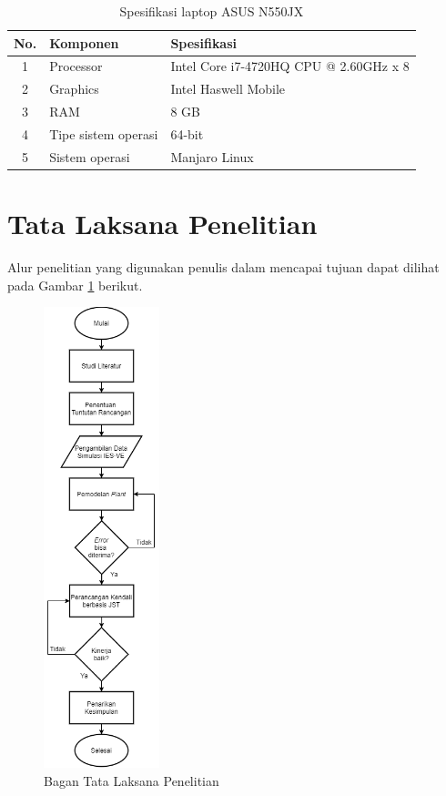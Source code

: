 \begin{table}[!h]
	\caption{Spesifikasi laptop ASUS N550JX}
	\label{tbl:4:speklaptop}
	\centering
	\begin{tabular}{|c|p{5cm}|p{8cm}|}
		\hline
		No. & Komponen & Spesifikasi \\ 
		\hline
		1 & Processor & Intel Core i7-4720HQ CPU @ 2.60GHz x 8 \\ 
		\hline
		2 & Graphics & Intel Haswell Mobile \\
		\hline
		3 & RAM & 8 GB \\ 
		\hline
		4 & Tipe sistem operasi & 64-bit \\
		\hline
		5 & Sistem operasi & Manjaro Linux \\ 
		\hline
	\end{tabular}
\end{table}

\section{Tata Laksana Penelitian}
Alur penelitian yang digunakan penulis dalam mencapai tujuan dapat dilihat pada Gambar \ref{fig:4:TataLaksanaPenelitian} berikut.
\begin{figure}[!h]
	\centering
	\includegraphics[width=0.3\textwidth]{figures/TataLaksanaPenelitian}
	\caption{Bagan Tata Laksana Penelitian}
	\label{fig:4:TataLaksanaPenelitian}
\end{figure}

